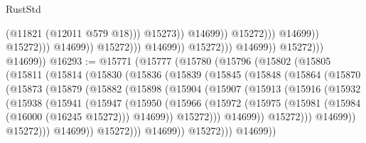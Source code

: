 \begin{lexlean}{RustStd}
\begin{coremodule}
                                                                (@11821 (@12011 @579 @18)))
                                                              @15273))
                                                          @14699))
                                                      @15272)))
                                                @14699))
                                            @15272)))
                                      @14699))
                                  @15272)))
                            @14699))
                        @15272)))
                  @14699))
              @15272)))
        @14699))
@16293 := @15771
    (@15777
      (@15780
        (@15796
          (@15802
            (@15805
              (@15811
                (@15814
                  (@15830
                    (@15836
                      (@15839
                        (@15845
                          (@15848
                            (@15864
                              (@15870
                                (@15873
                                  (@15879
                                    (@15882
                                      (@15898
                                        (@15904
                                          (@15907
                                            (@15913
                                              (@15916
                                                (@15932
                                                  (@15938
                                                    (@15941
                                                      (@15947
                                                        (@15950
                                                          (@15966
                                                            (@15972
                                                              (@15975
                                                                (@15981
                                                                  (@15984 (@16000 (@16245 @15272)))
                                                                  @14699))
                                                              @15272)))
                                                        @14699))
                                                    @15272)))
                                              @14699))
                                          @15272)))
                                    @14699))
                                @15272)))
                          @14699))
                      @15272)))
                @14699))

\end{coremodule}
\end{lexlean}

